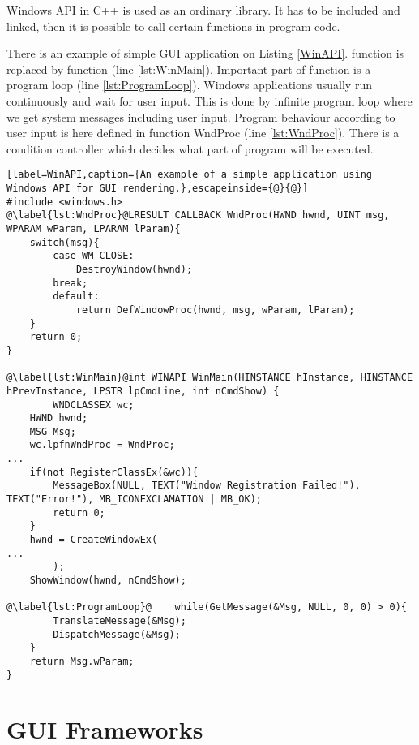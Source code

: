 Windows API in C++ is used as an ordinary library. It has to be included and linked, then it is possible to call certain functions in program code.

There is an example of simple GUI application on Listing \ref{WinAPI}.  function is replaced by  function (line \ref{lst:WinMain}). Important part of  function is a program loop (line \ref{lst:ProgramLoop}). Windows applications usually run continuously and wait for user input. This is done by infinite program loop where we get system messages including user input. Program behaviour according to user input is here defined in function WndProc (line \ref{lst:WndProc}). There is a condition controller which decides what part of program will be executed.

\begin{lstlisting}[label=WinAPI,caption={An example of a simple application using Windows API for GUI rendering.},escapeinside={@}{@}]
#include <windows.h>
@\label{lst:WndProc}@LRESULT CALLBACK WndProc(HWND hwnd, UINT msg, WPARAM wParam, LPARAM lParam){
    switch(msg){
        case WM_CLOSE:
            DestroyWindow(hwnd);
        break;
        default:
            return DefWindowProc(hwnd, msg, wParam, lParam);
    }
    return 0;
}

@\label{lst:WinMain}@int WINAPI WinMain(HINSTANCE hInstance, HINSTANCE hPrevInstance, LPSTR lpCmdLine, int nCmdShow) {
		WNDCLASSEX wc;
    HWND hwnd;
    MSG Msg;
    wc.lpfnWndProc = WndProc;    
...
    if(not RegisterClassEx(&wc)){
        MessageBox(NULL, TEXT("Window Registration Failed!"), TEXT("Error!"), MB_ICONEXCLAMATION | MB_OK);
        return 0;
    }
    hwnd = CreateWindowEx(
...
		);
    ShowWindow(hwnd, nCmdShow);

@\label{lst:ProgramLoop}@    while(GetMessage(&Msg, NULL, 0, 0) > 0){
        TranslateMessage(&Msg);
        DispatchMessage(&Msg);
    }
    return Msg.wParam;
}
\end{lstlisting}

\section{GUI Frameworks}


